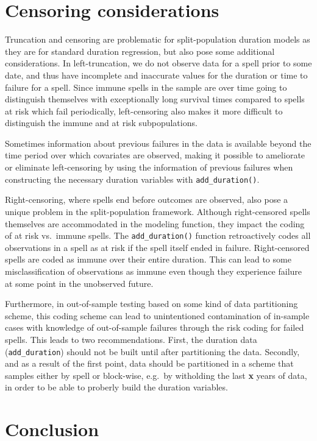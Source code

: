 \documentclass[article]{jss}
\begin{document}
\section{Censoring considerations}

Truncation and censoring are problematic for split-population duration
models as they are for standard duration regression, but also pose some
additional considerations. In left-truncation, we do not observe data
for a spell prior to some date, and thus have incomplete and inaccurate
values for the duration or time to failure for a spell. Since immune
spells in the sample are over time going to distinguish themselves with
exceptionally long survival times compared to spells at risk which fail
periodically, left-censoring also makes it more difficult to distinguish
the immune and at risk subpopulations.

Sometimes information about previous failures in the data is available
beyond the time period over which covariates are observed, making it
possible to ameliorate or eliminate left-censoring by using the
information of previous failures when constructing the necessary
duration variables with \texttt{add\_duration()}.

Right-censoring, where spells end before outcomes are observed, also
pose a unique problem in the split-population framework. Although
right-censored spells themselves are accommodated in the modeling
function, they impact the coding of at risk vs.~immune spells. The
\texttt{add\_duration()} function retroactively codes all observations
in a spell as at risk if the spell itself ended in failure.
Right-censored spells are coded as immune over their entire duration.
This can lead to some misclassification of observations as immune even
though they experience failure at some point in the unobserved future.

Furthermore, in out-of-sample testing based on some kind of data
partitioning scheme, this coding scheme can lead to unintentioned
contamination of in-sample cases with knowledge of out-of-sample
failures through the risk coding for failed spells. This leads to two
recommendations. First, the duration data (\texttt{add\_duration})
should not be built until after partitioning the data. Secondly, and as
a result of the first point, data should be partitioned in a scheme that
samples either by spell or block-wise, e.g.~by witholding the last
\textbf{x} years of data, in order to be able to proberly build the
duration variables.

\section{Conclusion}\label{conclusion}
\end{document}
